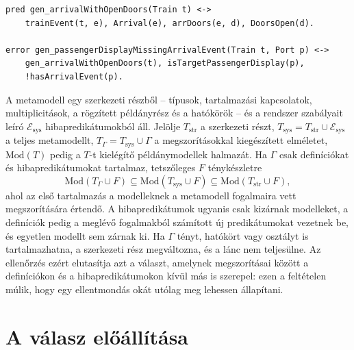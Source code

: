 \begin{lstlisting}[language=refinery,float=ht,caption={A futó példa megszorításai Refinery-szintaxisban.},label=lst:impl-constraints]
pred gen_arrivalWithOpenDoors(Train t) <->
    trainEvent(t, e), Arrival(e), arrDoors(e, d), DoorsOpen(d).

error gen_passengerDisplayMissingArrivalEvent(Train t, Port p) <->
    gen_arrivalWithOpenDoors(t), isTargetPassengerDisplay(p),
    !hasArrivalEvent(p).
\end{lstlisting}

A metamodell egy szerkezeti részből -- típusok, tartalmazási kapcsolatok, multiplicitások, a rögzített példányrész és a hatókörök -- és a rendszer szabályait leíró $\mathcal{E}_{\mathrm{sys}}$ hibapredikátumokból áll. Jelölje $T_{\mathrm{str}}$ a szerkezeti részt, $T_{\mathrm{sys}} = T_{\mathrm{str}} \cup \mathcal{E}_{\mathrm{sys}}$ a teljes metamodellt, $T_\Gamma = T_{\mathrm{sys}} \cup \Gamma$ a megszorításokkal kiegészített elméletet, $\mathrm{Mod}(T)$ pedig a $T$-t kielégítő példánymodellek halmazát. Ha $\Gamma$ csak definíciókat és hibapredikátumokat tartalmaz, tetszőleges $F$ ténykészletre
\begin{equation}
\mathrm{Mod}(T_\Gamma \cup F) \subseteq \mathrm{Mod}(T_{\mathrm{sys}} \cup F) \subseteq \mathrm{Mod}(T_{\mathrm{str}} \cup F), \label{eq:impl-chain}
\end{equation}
ahol az első tartalmazás a modelleknek a metamodell fogalmaira vett megszorítására értendő. A hibapredikátumok ugyanis csak kizárnak modelleket, a definíciók pedig a meglévő fogalmakból számított új predikátumokat vezetnek be, és egyetlen modellt sem zárnak ki. Ha $\Gamma$ tényt, hatókört vagy osztályt is tartalmazhatna, a szerkezeti rész megváltozna, és a lánc nem teljesülne. Az ellenőrzés ezért elutasítja azt a választ, amelynek megszorításai között a definíciókon és a hibapredikátumokon kívül más is szerepel: ezen a feltételen múlik, hogy egy ellentmondás okát utólag meg lehessen állapítani.


\section{A válasz előállítása}
\label{sec:impl-prompt}

